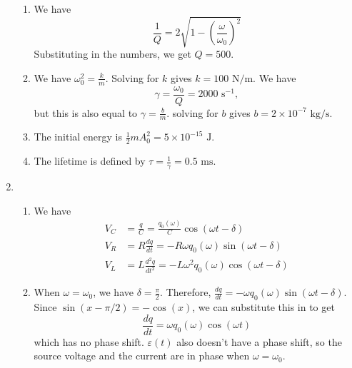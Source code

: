 \documentclass{article}
\begin{document}
\begin{enumerate}
\begin{enumerate}
        \item We have 
        \begin{equation}
            \frac{1}{Q} = 2\sqrt{1-\left(\frac{\omega}{\omega_0}\right)^2}
        \end{equation}
        Substituting in the numbers, we get $Q=500$.
        \item We have $\omega_0^2 = \frac{k}{m}$. Solving for $k$ gives $k=100\text{ N/m}.$ We have 
        \begin{equation}
            \gamma = \frac{\omega_0}{Q} = 2000\text{ s}^{-1},
        \end{equation}
        but this is also equal to $\gamma = \frac{b}{m}$. solving for $b$ gives $b=2\times 10^{-7} \text{ kg/s}.$
        \item The initial energy is $\frac{1}{2}mA_0^2 = 5\times 10^{-15} \text{ J}.$
        \item The lifetime is defined by $\tau = \frac{1}{\gamma} = 0.5\text{ ms}.$
    \end{enumerate}
    \item \begin{enumerate}
        \item We have 
        \begin{align}
            V_C &= \frac{q}{C} = \frac{q_0(\omega)}{C}\cos(\omega t-\delta) \\ 
            V_R &= R\frac{dq}{dt} = -R\omega q_0(\omega)\sin(\omega t-\delta) \\ 
            V_L &= L\frac{d^2q}{dt^2} = -L\omega^2 q_0(\omega)\cos(\omega t-\delta)
        \end{align}
        \item When $\omega=\omega_0$, we have $\delta=\frac{\pi}{2}.$ Therefore, $\frac{dq}{dt} = -\omega q_0(\omega)\sin(\omega t- \delta).$ Since $\sin(x-\pi/2)=-\cos(x)$, we can substitute this in to get 
        \begin{equation}
            \frac{dq}{dt} = \omega q_0(\omega)\cos(\omega t)
        \end{equation}
        which has no phase shift. $\varepsilon(t)$ also doesn't have a phase shift, so the source voltage and the current are in phase when $\omega=\omega_0$.
    \end{enumerate}
\end{enumerate}
\end{document}
